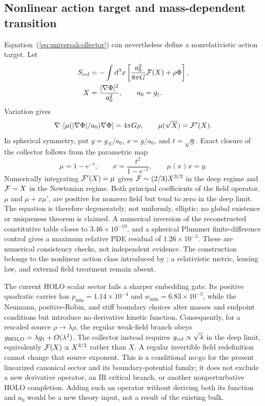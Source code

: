 \documentclass[10pt]{article}
\newcommand{\dd}{\mathrm{d}}
\begin{document}
\subsection{Nonlinear action target and mass-dependent transition}

Equation~(\ref{eq:universalcollector}) can nevertheless define a
nonrelativistic action target.  Let
\begin{equation}
 \begin{aligned}
 S_{\rm col}&=-\int\dd^3x\left[
 \frac{a_0^2}{8\pi G}{\cal F}(X)+\rho\Phi\right],\\
 X&=\frac{|\nabla\Phi|^2}{a_0^2},\qquad a_0=g_\dagger .
 \end{aligned}
 \label{eq:collectoraction}
\end{equation}
Variation gives
\begin{equation}
 \nabla\!\cdot\!\left[\mu(|\nabla\Phi|/a_0)\nabla\Phi\right]
 =4\pi G\rho,\qquad \mu(\sqrt X)={\cal F}'(X).
 \label{eq:collectorpde}
\end{equation}
In spherical symmetry, put $y=g_N/a_0$, $x=g/a_0$, and
$t=\sqrt y$.  Exact closure of the collector follows from the parametric map
\begin{equation}
 \mu=1-e^{-t},\qquad x=\frac{t^2}{1-e^{-t}},\qquad
 \mu(x)x=y.
 \label{eq:collectormap}
\end{equation}
Numerically integrating ${\cal F}'(X)=\mu$ gives
${\cal F}\sim(2/3)X^{3/2}$ in the deep regime and ${\cal F}\sim X$ in the
Newtonian regime.  Both principal coefficients of the field operator,
$\mu$ and $\mu+x\mu'$, are positive for nonzero field but tend to zero in the
deep limit.  The equation is therefore degenerately, not uniformly, elliptic;
no global existence or uniqueness theorem is claimed.  A numerical inversion
of the reconstructed constitutive table closes to $3.46\times10^{-10}$, and a
spherical Plummer finite-difference control gives a maximum relative PDE
residual of $1.26\times10^{-5}$.  These are numerical consistency checks, not
independent evidence.  The construction belongs to the nonlinear action class introduced by
\citet{BekensteinMilgrom1984}; a relativistic metric, lensing law, and external
field treatment remain absent.

The current HOLO scalar sector fails a sharper embedding gate.  Its positive
quadratic carrier has $p_{\min}=1.14\times10^{-4}$ and
$w_{\min}=6.83\times10^{-3}$, while the Neumann, positive-Robin, and stiff
boundary choices alter masses and endpoint conditions but introduce no
derivative kinetic function.  Consequently, for a rescaled source
$\rho\rightarrow\lambda\rho$, the regular weak-field branch obeys
$g_{\rm HOLO}=\lambda g_1+O(\lambda^2)$.  The collector instead requires
$g_{\rm col}\propto\sqrt{\lambda}$ in the deep limit, equivalently
${\cal F}(X)\propto X^{3/2}$ rather than $X$.  A regular invertible field
redefinition cannot change that source exponent.  This is a conditional
no-go for the present linearized canonical sector and its boundary-potential
family; it does not exclude a new derivative operator, an IR critical branch,
or another nonperturbative HOLO completion.  Adding such an operator without
deriving both its function and $a_0$ would be a new theory input, not a result
of the existing bulk.
\end{document}
